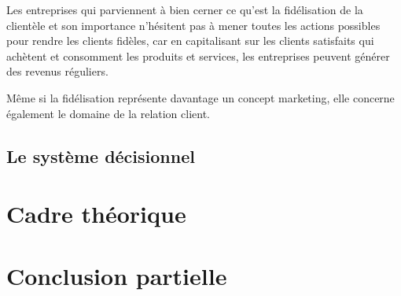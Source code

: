         Les entreprises qui parviennent à bien cerner ce qu’est la fidélisation
        de la clientèle et son importance n’hésitent pas à mener toutes les actions
        possibles pour rendre les clients fidèles, car en capitalisant sur les clients satisfaits
        qui achètent et consomment les produits et services, les entreprises peuvent générer des revenus réguliers.
        \newline

        Même si la fidélisation représente davantage un concept marketing,
        elle concerne également le domaine de la relation client.
        \subsection[Le système décisionnel]{Le système décisionnel}
    
    \section[Cadre théorique]{Cadre théorique}
    \section[Conclusion partielle]{Conclusion partielle}